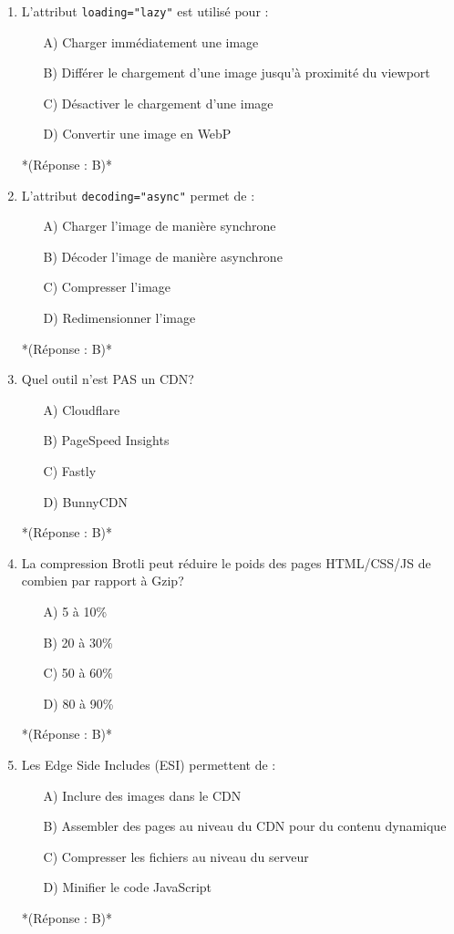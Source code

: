 \documentclass[12pt,a4paper,twoside]{report}
\begin{document}
\begin{enumerate}
\item L'attribut \texttt{loading="lazy"} est utilisé pour :
\begin{itemize}
\item[A)] Charger immédiatement une image
\item[B)] Différer le chargement d'une image jusqu'à proximité du viewport
\item[C)] Désactiver le chargement d'une image
\item[D)] Convertir une image en WebP
\end{itemize}
*(Réponse : B)*

\item L'attribut \texttt{decoding="async"} permet de :
\begin{itemize}
\item[A)] Charger l'image de manière synchrone
\item[B)] Décoder l'image de manière asynchrone
\item[C)] Compresser l'image
\item[D)] Redimensionner l'image
\end{itemize}
*(Réponse : B)*

\item Quel outil n'est PAS un CDN?
\begin{itemize}
\item[A)] Cloudflare
\item[B)] PageSpeed Insights
\item[C)] Fastly
\item[D)] BunnyCDN
\end{itemize}
*(Réponse : B)*

\item La compression Brotli peut réduire le poids des pages HTML/CSS/JS de combien par rapport à Gzip?
\begin{itemize}
\item[A)] 5 à 10\%
\item[B)] 20 à 30\%
\item[C)] 50 à 60\%
\item[D)] 80 à 90\%
\end{itemize}
*(Réponse : B)*

\item Les Edge Side Includes (ESI) permettent de :
\begin{itemize}
\item[A)] Inclure des images dans le CDN
\item[B)] Assembler des pages au niveau du CDN pour du contenu dynamique
\item[C)] Compresser les fichiers au niveau du serveur
\item[D)] Minifier le code JavaScript
\end{itemize}
*(Réponse : B)*


\end{enumerate}
\end{document}
